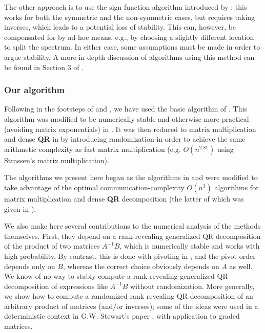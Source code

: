 \documentclass{article}
\theoremstyle{definition}
\begin{document}
The other approach is to use the sign function algorithm introduced by \cite{Roberts}; this works for both the symmetric and the non-symmetric cases, but requires taking inverses, which leads to a potential loss of stability. This can, however, be compensated for by ad-hoc means, e.g., by choosing a slightly different location to split the spectrum. In either case, some assumptions must be made in order to argue stability. 
A more in-depth discussion of algorithms using this method can be found in Section 3 of \cite{baidemmelgu94}. 


\subsubsection{Our algorithm}

Following in the footsteps of \cite{baidemmelgu94} and \cite{DDH07}, we have used the basic algorithm of \cite{godunov86,bulgakov88,malyshev89,malyshev92,malyshev93}.  This algorithm was modified to be numerically stable and otherwise more practical (avoiding matrix exponentials) in \cite{baidemmelgu94}. 
It was then reduced to matrix multiplication and dense \textbf{QR} in \cite{DDH07} by introducing randomization in order to achieve the same arithmetic complexity as fast matrix multiplication (e.g. $O(n^{2.81})$ using Strassen's matrix multiplication). 

The algorithms we present here began as the algorithms in \cite{DDH07} and were modified to take advantage of the optimal communication-complexity $O(n^3)$ algorithms for matrix multiplication and dense \textbf{QR} decomposition (the latter of which was given in \cite{DGHL08}).

We also make here several contributions to the numerical analysis of the methods themselves. First, they depend on a rank-revealing generalized QR decomposition of the product of two matrices $A^{-1}B$,  which is numerically stable and works with high probability. By contrast, this is done with pivoting in \cite{baidemmelgu94}, and the pivot order depends only on $B$, whereas the correct choice obviously depends on $A$ as well. We know of no way to stably compute a rank-revealing generalized QR decomposition of expressions like $A^{-1}B$ without randomization. More generally, we show how to compute a randomized rank revealing QR decomposition of an arbitrary product of matrices (and/or inverses); some of the ideas were used in a deterministic context in G.W. Stewart's paper \cite{Stewart95}, with application to graded matrices. 
\end{document}
